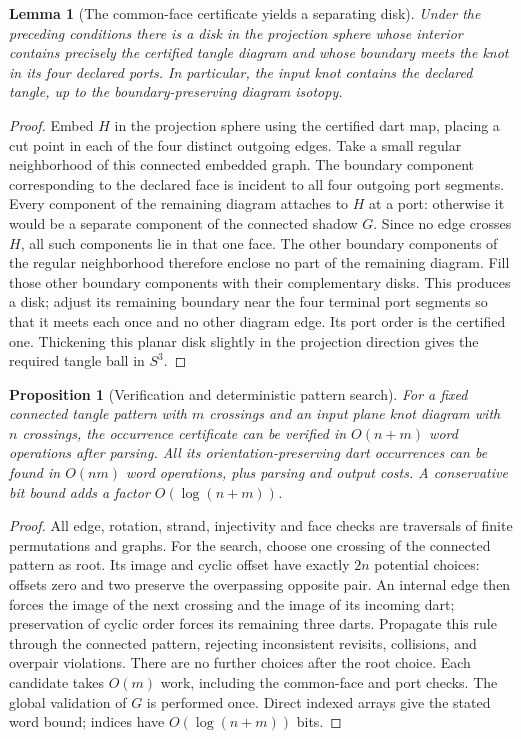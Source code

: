 \documentclass[11pt,a4paper]{article}
\newtheorem{lemma}[theorem]{Lemma}
\newtheorem{proposition}[theorem]{Proposition}
\theoremstyle{definition}
\theoremstyle{remark}
\numberwithin{equation}{section}
\begin{document}
\begin{lemma}[The common-face certificate yields a separating disk]
\label{lem:mon:disk}
Under the preceding conditions there is a disk in the projection sphere whose
interior contains precisely the certified tangle diagram and whose boundary
meets the knot in its four declared ports.  In particular, the input knot
contains the declared tangle, up to the boundary-preserving diagram isotopy.
\end{lemma}

\begin{proof}
Embed $H$ in the projection sphere using the certified dart map, placing a cut
point in each of the four distinct outgoing edges. Take a small regular
neighborhood of this connected
embedded graph.  The boundary component corresponding to the declared face
is incident to all four outgoing port segments.  Every component of the
remaining diagram attaches to $H$ at a port: otherwise it would be a separate
component of the connected shadow $G$.  Since no edge crosses $H$, all such
components lie in that one face.  The other boundary components of the regular
neighborhood therefore enclose no part of the remaining diagram.
Fill those other boundary components with their complementary disks.  This
produces a disk; adjust its remaining boundary near the four terminal port
segments so that it meets each once and no other diagram edge.  Its port
order is the certified one.  Thickening this planar disk slightly in the
projection direction gives the required tangle ball in $S^3$.
\end{proof}

\begin{proposition}[Verification and deterministic pattern search]
\label{prop:mon:matching}
For a fixed connected tangle pattern with $m$ crossings and an input plane
knot diagram with $n$ crossings, the occurrence certificate can be verified
in $O(n+m)$ word operations after parsing.  All its orientation-preserving
dart occurrences can be found in $O(nm)$ word operations, plus parsing and
output costs.  A conservative bit bound adds a factor $O(\log(n+m))$.
\end{proposition}

\begin{proof}
All edge, rotation, strand, injectivity and face checks are traversals of
finite permutations and graphs.  For the search, choose one crossing of the
connected pattern as root.  Its image and cyclic offset have exactly $2n$ potential
choices: offsets zero and two preserve the overpassing opposite pair.  An internal edge then forces the image of the next crossing and
the image of its incoming dart; preservation of cyclic order forces its
remaining three darts.  Propagate this rule through the connected pattern,
rejecting inconsistent revisits, collisions, and overpair violations.
There are no further choices after the root choice.  Each candidate takes
$O(m)$ work, including the common-face and port checks.  The global validation
of $G$ is performed once. Direct indexed arrays give the stated word bound;
indices have $O(\log(n+m))$ bits.
\end{proof}
\end{document}
